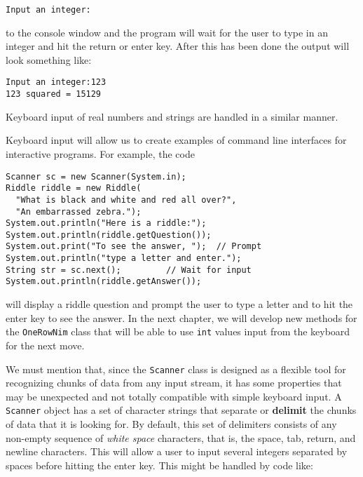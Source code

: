 \begin{jjjlisting}
\begin{lstlisting}
Input an integer:
\end{lstlisting}
\end{jjjlisting}

\noindent to the console window and the program will wait for the user to type in an 
integer and hit the return or enter key.  After this has been done the output
will look something like:

\begin{jjjlisting}
\begin{lstlisting}
Input an integer:123
123 squared = 15129
\end{lstlisting}
\end{jjjlisting}

\noindent Keyboard input of real numbers and strings are handled in a similar manner.

Keyboard input will allow us to create examples of command line interfaces
for interactive programs.  For example, the code

\begin{jjjlisting}
\begin{lstlisting}
Scanner sc = new Scanner(System.in); 
Riddle riddle = new Riddle(
  "What is black and white and red all over?",
  "An embarrassed zebra.");
System.out.println("Here is a riddle:");
System.out.println(riddle.getQuestion());
System.out.print("To see the answer, ");  // Prompt
System.out.println("type a letter and enter.");
String str = sc.next();         // Wait for input
System.out.println(riddle.getAnswer());
\end{lstlisting}
\end{jjjlisting}

\noindent will display a riddle question and prompt the user to type a letter and
to hit the enter key to see the answer.  In the next chapter, we will 
develop new methods for the {\tt OneRowNim} class that will be able to
use {\tt int} values input from the keyboard for the next move.

We must mention that, since the {\tt Scanner} class is designed
as a flexible tool for recognizing chunks of data from any
input stream, it has some properties that may be unexpected and
not totally compatible with simple keyboard input.  A {\tt Scanner}
object has a set of character strings that separate or {\bf delimit} the
chunks of data that it is looking for.  By default, this set of
delimiters consists of any non-empty sequence of {\it white space} characters, 
that is, the space, tab, return, and newline characters. This will allow
a user to input several integers separated by spaces before hitting
the enter key.  This might be handled by code like:


